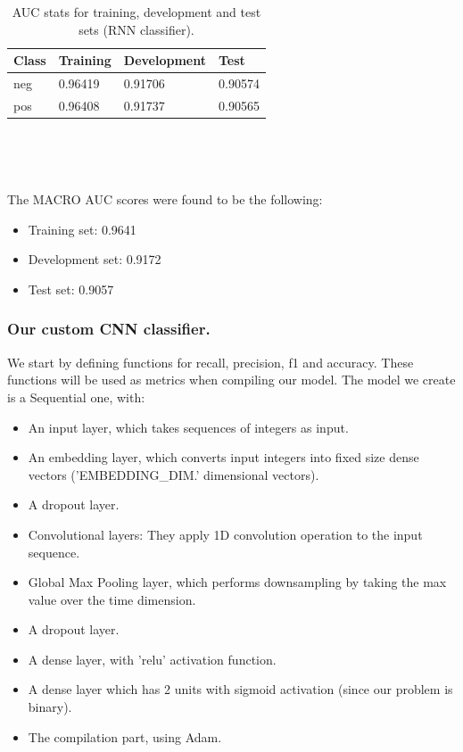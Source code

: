 \documentclass[10pt, a4paper]{article}
\begin{document}
	\begin{table}
		\begin{tabular}{|l|l|l|l|}
			\hline
			\cellcolor{blue!25}\textbf{Class} & \cellcolor{blue!25}\textbf{Training} & \cellcolor{blue!25}\textbf{Development} & \cellcolor{blue!25}\textbf{Test}\\
			\hline
			neg & 0.96419 & 0.91706 & 0.90574 \\\hline
			pos & 0.96408 & 0.91737 & 0.90565 \\\hline
			
		\end{tabular}
		\centering
		\caption{AUC stats for training, development and test sets (RNN classifier).}
		\label{tab::ex-1-stats-auc}
	\end{table}
	\ 
	
	
	
	\
	
	The MACRO AUC scores were found to be the following:
	\begin{itemize}
		\item Training set: 0.9641
		\item Development set: 0.9172
		\item Test set: 0.9057
	\end{itemize}

    \subsubsection{Our custom CNN classifier.}
    We start by defining functions for recall, precision, f1 and accuracy. These functions will be used as metrics when compiling our model. The model we create is a Sequential one, with:
    \begin{itemize}
            \item An input layer, which takes sequences of integers as input.
		\item An embedding layer, which converts input integers into fixed size dense vectors ('EMBEDDING\_DIM.' dimensional vectors).
		\item A dropout layer.
		\item Convolutional layers: They apply 1D convolution operation to the input sequence.
		\item Global Max Pooling layer, which performs downsampling by taking the max value over the time dimension.
            \item A dropout layer.
		\item A dense layer, with 'relu' activation function.
            \item A dense layer which has 2 units with sigmoid activation (since our problem is binary).
            \item The compilation part, using Adam.
	\end{itemize}
\end{document}
